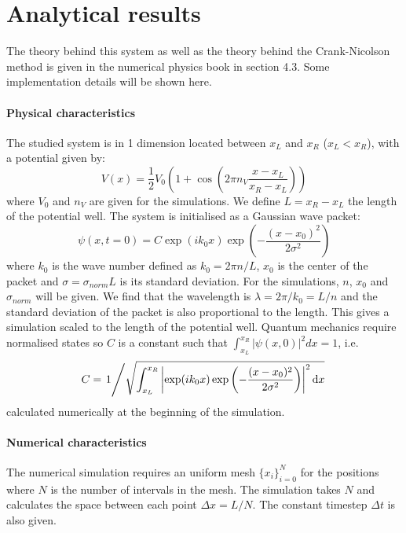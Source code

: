 \section{Analytical results}

The theory behind this system as well as the theory behind the Crank-Nicolson method is given in the numerical physics book \cite{physnumbook} in section 4.3. Some implementation details will be shown here.

\paragraph{Physical characteristics} The studied system is in 1 dimension located between \(x_L\) and \(x_R\) (\(x_L < x_R\)), with a potential given by:
\begin{equation}
    V(x) = \frac{1}{2} V_0 \left( 1 + \cos \left( 2\pi n_V \frac{x - x_L}{x_R - x_L} \right) \right)
\end{equation}
where \(V_0\) and \(n_V\) are given for the simulations. We define \(L = x_R - x_L\) the length of the potential well. The system is initialised as a Gaussian wave packet:
\begin{equation}
    \psi(x, t=0) = C \exp(i k_0 x)\exp\left(-\frac{(x-x_0)^2}{2\sigma^2}\right)
\end{equation}
where $k_0$ is the wave number defined as $k_0 = 2\pi n/L$, $x_0$ is the center of the packet and \mbox{$\sigma = \sigma_{norm}L$} is its standard deviation. For the simulations, $n$, $x_0$ and $\sigma_{norm}$ will be given. We find that the wavelength is $\lambda = 2\pi/k_0 = L/n$ and the standard deviation of the packet is also proportional to the length. This gives a simulation scaled to the length of the potential well. Quantum mechanics require normalised states so \(C\) is a constant such that \mbox{\(\int_{x_L}^{x_R}|\psi(x,0)|^2 dx = 1\)}, i.e.
\begin{equation}
    C = \left. 1\middle/\sqrt{\int_{x_L}^{x_R} \left|\exp(i k_0 x)\exp\left(-\frac{(x-x_0)^2}{2\sigma^2}\right)\right|^2 \mathrm{d}x} \right.
\end{equation}
calculated numerically at the beginning of the simulation.

\paragraph{Numerical characteristics} The numerical simulation requires an uniform mesh $\{x_i\}_{i=0}^N$ for the positions where $N$ is the number of intervals in the mesh. The simulation takes $N$ and calculates the space between each point $\Delta x = L/N$. The constant timestep $\Delta t$ is also given.

